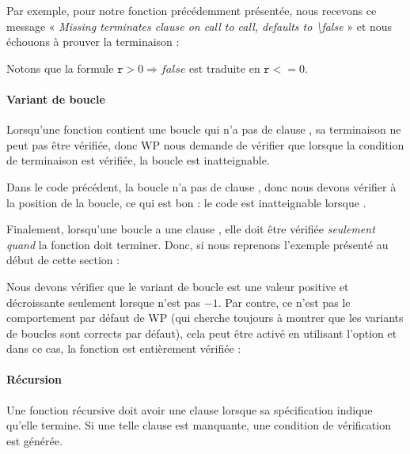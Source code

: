 Par exemple, pour notre fonction  précédemment présentée,
nous recevons ce message
« \emph{Missing terminates clause on call to call, defaults to \textbackslash{}false} »
et nous échouons à prouver la terminaison :




Notons que la formule $\mathtt{r} > 0 \Rightarrow false$ est traduite en
$\mathtt{r} <= 0$.



\paragraph{Variant de boucle}


Lorsqu'une fonction contient une boucle qui n'a pas de clause
, sa terminaison ne peut pas être vérifiée, donc WP
nous demande de vérifier que lorsque la condition de terminaison est vérifiée,
la boucle est inatteignable.




Dans le code précédent, la boucle n'a pas de clause ,
donc nous devons vérifier  à
la position de la boucle, ce qui est bon : le code est inatteignable lorsque
.


Finalement, lorsqu'une boucle a une clause , elle doit
être vérifiée \emph{seulement quand} la fonction doit terminer. Donc, si nous
reprenons l'exemple présenté au début de cette section :




Nous devons vérifier que le variant de boucle est une valeur positive et
décroissante seulement lorsque  n'est pas $-1$. Par
contre, ce n'est pas le comportement par défaut de WP (qui cherche toujours à
montrer que les variants de boucles sont corrects par défaut), cela peut être
activé en utilisant l'option  et dans
ce cas, la fonction est entièrement vérifiée :




\paragraph{Récursion}


Une fonction récursive doit avoir une clause  lorsque sa
spécification indique qu'elle termine. Si une telle clause est manquante, une
condition de vérification  est générée.


